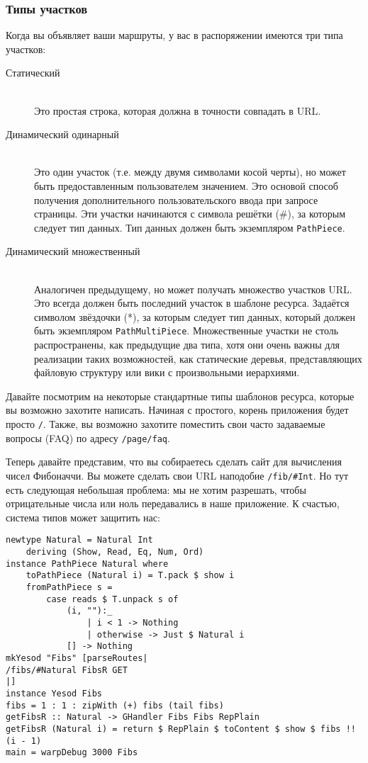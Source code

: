 \subsubsection{Типы участков}
Когда вы объявляет ваши маршруты, у вас в распоряжении имеются три
типа участков:
\begin{description}
\item[Статический] \hfill \\
Это простая строка, которая должна в точности совпадать в URL.

\item[Динамический одинарный] \hfill \\
Это один участок (т.е. между двумя символами косой черты), но может
быть предоставленным пользователем значением. Это основой способ
получения дополнительного пользовательского ввода при запросе
страницы. Эти участки начинаются с символа решётки (\#), за которым
следует тип данных. Тип данных должен быть экземпляром
\lstinline!PathPiece!.

\item [Динамический множественный] \hfill \\
Аналогичен предыдущему, но может получать множество участков URL. Это
всегда должен быть последний участок в шаблоне ресурса. Задаётся
символом звёздочки (*), за которым следует тип данных, который должен
быть экземпляром \lstinline!PathMultiPiece!. Множественные участки не
столь распространены, как предыдущие два типа, хотя они очень важны
для реализации таких возможностей, как статические деревья,
представляющих файловую структуру или вики с произвольными иерархиями.
\end{description}

Давайте посмотрим на некоторые стандартные типы шаблонов ресурса,
которые вы возможно захотите написать. Начиная с простого, корень
приложения будет просто \lstinline!/!. Также, вы возможно захотите
поместить свои часто задаваемые вопросы (FAQ) по адресу
\lstinline!/page/faq!.

Теперь давайте представим, что вы собираетесь сделать сайт для
вычисления чисел Фибоначчи. Вы можете сделать свои URL наподобие
\lstinline!/fib/#Int!. Но тут есть следующая небольшая проблема: мы не
хотим разрешать, чтобы отрицательные числа или ноль передавались в
наше приложение. К счастью, система типов может защитить нас:
\begin{lstlisting}
newtype Natural = Natural Int
    deriving (Show, Read, Eq, Num, Ord)
instance PathPiece Natural where
    toPathPiece (Natural i) = T.pack $ show i
    fromPathPiece s =
        case reads $ T.unpack s of
            (i, ""):_
                | i < 1 -> Nothing
                | otherwise -> Just $ Natural i
            [] -> Nothing
mkYesod "Fibs" [parseRoutes|
/fibs/#Natural FibsR GET
|]
instance Yesod Fibs
fibs = 1 : 1 : zipWith (+) fibs (tail fibs)
getFibsR :: Natural -> GHandler Fibs Fibs RepPlain
getFibsR (Natural i) = return $ RepPlain $ toContent $ show $ fibs !! (i - 1)
main = warpDebug 3000 Fibs
\end{lstlisting}


